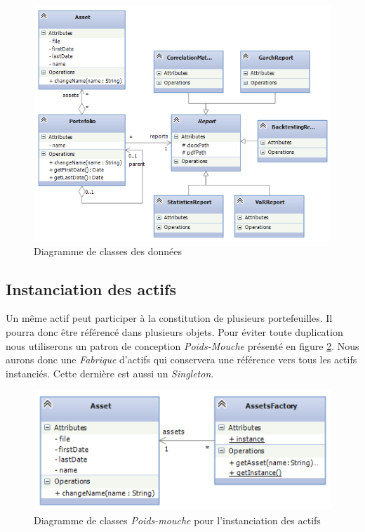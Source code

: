 \documentclass[a4paper]{report}
\begin{document}
\begin{figure}
  	\center
  	\includegraphics[width=1\textwidth]{diagramme-classes-donnees.png}
  	\caption{Diagramme de classes des données}
  	\label{fig:diagramme-classes-donnees}
\end{figure}


\subsection{Instanciation des actifs}

Un même actif peut participer à la constitution de plusieurs portefeuilles.
Il pourra donc être référencé dans plusieurs objets.
Pour éviter toute duplication nous utiliserons un patron de conception \textit{Poids-Mouche} présenté en figure \ref{fig:diagramme-classes-flyweight}.
Nous aurons donc une \textit{Fabrique} d'actifs qui conservera une référence vers tous les actifs instanciés. Cette dernière est aussi un \textit{Singleton}.

\begin{figure}
  	\center
  	\includegraphics[width=1\textwidth]{diagramme-classes-flyweight.png}
  	\caption{Diagramme de classes \textit{Poids-mouche} pour l'instanciation des actifs}
  	\label{fig:diagramme-classes-flyweight}
\end{figure}
\end{document}
